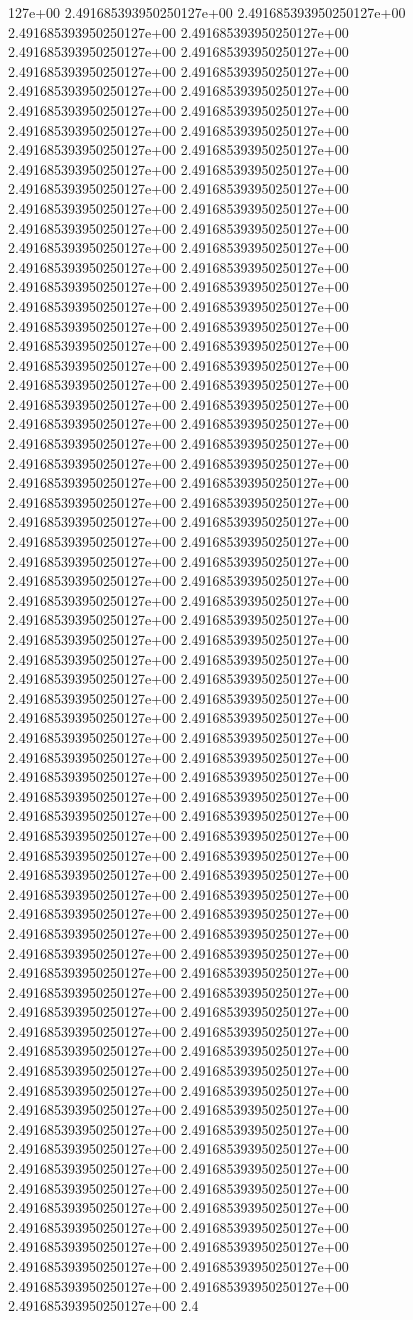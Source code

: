 127e+00	2.491685393950250127e+00	2.491685393950250127e+00	2.491685393950250127e+00	2.491685393950250127e+00	2.491685393950250127e+00	2.491685393950250127e+00	2.491685393950250127e+00	2.491685393950250127e+00	2.491685393950250127e+00	2.491685393950250127e+00	2.491685393950250127e+00	2.491685393950250127e+00	2.491685393950250127e+00	2.491685393950250127e+00	2.491685393950250127e+00	2.491685393950250127e+00	2.491685393950250127e+00	2.491685393950250127e+00	2.491685393950250127e+00	2.491685393950250127e+00	2.491685393950250127e+00	2.491685393950250127e+00	2.491685393950250127e+00	2.491685393950250127e+00	2.491685393950250127e+00	2.491685393950250127e+00	2.491685393950250127e+00	2.491685393950250127e+00	2.491685393950250127e+00	2.491685393950250127e+00	2.491685393950250127e+00	2.491685393950250127e+00	2.491685393950250127e+00	2.491685393950250127e+00	2.491685393950250127e+00	2.491685393950250127e+00	2.491685393950250127e+00	2.491685393950250127e+00	2.491685393950250127e+00	2.491685393950250127e+00	2.491685393950250127e+00	2.491685393950250127e+00	2.491685393950250127e+00	2.491685393950250127e+00	2.491685393950250127e+00	2.491685393950250127e+00	2.491685393950250127e+00	2.491685393950250127e+00	2.491685393950250127e+00	2.491685393950250127e+00	2.491685393950250127e+00	2.491685393950250127e+00	2.491685393950250127e+00	2.491685393950250127e+00	2.491685393950250127e+00	2.491685393950250127e+00	2.491685393950250127e+00	2.491685393950250127e+00	2.491685393950250127e+00	2.491685393950250127e+00	2.491685393950250127e+00	2.491685393950250127e+00	2.491685393950250127e+00	2.491685393950250127e+00	2.491685393950250127e+00	2.491685393950250127e+00	2.491685393950250127e+00	2.491685393950250127e+00	2.491685393950250127e+00	2.491685393950250127e+00	2.491685393950250127e+00	2.491685393950250127e+00	2.491685393950250127e+00	2.491685393950250127e+00	2.491685393950250127e+00	2.491685393950250127e+00	2.491685393950250127e+00	2.491685393950250127e+00	2.491685393950250127e+00	2.491685393950250127e+00	2.491685393950250127e+00	2.491685393950250127e+00	2.491685393950250127e+00	2.491685393950250127e+00	2.491685393950250127e+00	2.491685393950250127e+00	2.491685393950250127e+00	2.491685393950250127e+00	2.491685393950250127e+00	2.491685393950250127e+00	2.491685393950250127e+00	2.491685393950250127e+00	2.491685393950250127e+00	2.491685393950250127e+00	2.491685393950250127e+00	2.491685393950250127e+00	2.491685393950250127e+00	2.491685393950250127e+00	2.491685393950250127e+00	2.491685393950250127e+00	2.491685393950250127e+00	2.491685393950250127e+00	2.491685393950250127e+00	2.491685393950250127e+00	2.491685393950250127e+00	2.491685393950250127e+00	2.491685393950250127e+00	2.491685393950250127e+00	2.491685393950250127e+00	2.491685393950250127e+00	2.491685393950250127e+00	2.491685393950250127e+00	2.491685393950250127e+00	2.491685393950250127e+00	2.491685393950250127e+00	2.491685393950250127e+00	2.491685393950250127e+00	2.491685393950250127e+00	2.491685393950250127e+00	2.491685393950250127e+00	2.491685393950250127e+00	2.491685393950250127e+00	2.491685393950250127e+00	2.491685393950250127e+00	2.491685393950250127e+00	2.491685393950250127e+00	2.491685393950250127e+00	2.491685393950250127e+00	2.491685393950250127e+00	2.491685393950250127e+00	2.491685393950250127e+00	2.491685393950250127e+00	2.491685393950250127e+00	2.4